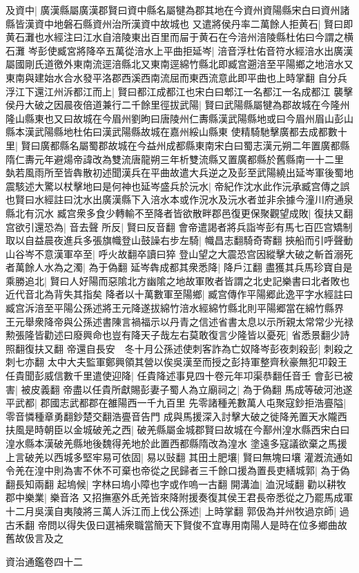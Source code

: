 及資中|{
	廣漢縣屬廣漢郡賢曰資中縣名屬犍為郡其地在今資州資陽縣宋白曰資州諸縣皆漢資中地磐石縣資州治所漢資中故城也}
又遣將侯丹率二萬餘人拒黄石|{
	賢曰即黄石灘也水經注曰江水自涪陵東出百里而屇于黄石在今涪州涪陵縣杜佑曰今謂之横石灘}
岑彭使臧宮將降卒五萬從涪水上平曲拒延岑|{
	涪音浮杜佑音符水經涪水出廣漢屬國剛氏道徼外東南流逕涪縣北又東南逕綿竹縣北即臧宫遡涪至平陽鄉之地涪水又東南與建始水合水發平洛郡西溪西南流屈而東西流意此即平曲也上時掌翻}
自分兵浮江下還江州泝都江而上|{
	賢曰都江成都江也宋白曰郫江一名都江一名成都江}
襲擊侯丹大破之因晨夜倍道兼行二千餘里徑拔武陽|{
	賢曰武陽縣屬犍為郡故城在今隆州隆山縣東也又曰故城在今眉州劉昫曰唐陵州仁夀縣漢武陽縣地或曰今眉州眉山彭山縣本漢武陽縣地杜佑曰漢武陽縣故城在嘉州綏山縣東}
使精騎馳擊廣都去成都數十里|{
	賢曰廣都縣名屬蜀郡故城在今益州成都縣東南宋白曰蜀志漢元朔二年置廣都縣隋仁夀元年避煬帝諱改為雙流唐龍朔三年析雙流縣又置廣都縣於舊縣南一十二里}
埶若風雨所至皆犇散初述聞漢兵在平曲故遣大兵逆之及彭至武陽繞出延岑軍後蜀地震駭述大驚以杖擊地曰是何神也延岑盛兵於沅水|{
	帝紀作沈水此作沅承臧宫傳之誤也賢曰水經註曰沈水出廣漢縣下入涪水本或作況水及沅水者並非余據今潼川府通泉縣北有沉水}
臧宫衆多食少轉輸不至降者皆欲散畔郡邑復更保聚觀望成敗|{
	復扶又翻}
宫欲引還恐為|{
	音去聲}
所反|{
	賢曰反音翻}
會帝遣謁者將兵詣岑彭有馬七百匹宫矯制取以自益晨夜進兵多張旗幟登山鼓譟右步左騎|{
	幟昌志翻騎奇寄翻}
挾船而引呼聲動山谷岑不意漢軍卒至|{
	呼火故翻卒讀曰猝}
登山望之大震恐宫因縱擊大破之斬首溺死者萬餘人水為之濁|{
	為于偽翻}
延岑犇成都其衆悉降|{
	降戶江翻}
盡獲其兵馬珍寶自是乘勝追北|{
	賢曰人好陽而惡隂北方幽隂之地故軍敗者皆謂之北史記樂書曰北者敗也近代音北為背失其指矣}
降者以十萬數軍至陽鄉|{
	臧宫傳作平陽郷此逸平字水經註曰臧宫泝涪至平陽公孫述將王元降遂拔綿竹涪水經綿竹縣北則平陽郷當在綿竹縣界}
王元舉衆降帝與公孫述書陳言禍福示以丹青之信述省書太息以示所親太常常少光禄勲張隆皆勸述曰廢興命也豈有降天子哉左右莫敢復言少隆皆以憂死|{
	省悉景翻少詩照翻復扶又翻}
帝還自長安　冬十月公孫述使刺客詐為亡奴降岑彭夜刺殺彭|{
	刺殺之刺七亦翻}
太中大夫監軍鄭興領其營以俟吳漢至而授之彭持軍整齊秋豪無犯卭穀王任貴聞彭威信數千里遣使迎降|{
	任貴降述事見四十卷元年卭渠恭翻任音壬}
會彭已被害|{
	被皮義翻}
帝盡以任貴所獻賜彭妻子蜀人為立廟祠之|{
	為于偽翻}
馬成等破河池遂平武都|{
	郡國志武都郡在雒陽西一千九百里}
先零諸種羌數萬人屯聚寇鈔拒浩亹隘|{
	零音憐種章勇翻鈔楚交翻浩亹音告門}
成與馬援深入討擊大破之徙降羌置天水隴西扶風是時朝臣以金城破羌之西|{
	破羌縣屬金城郡賢曰故城在今鄯州湟水縣西宋白曰湟水縣本漢破羌縣地後魏得羌地於此置西都縣隋改為湟水}
塗遠多寇議欲棄之馬援上言破羌以西城多堅牢易可依固|{
	易以䜴翻}
其田土肥壤|{
	賢曰無塊曰壤}
灌漑流通如令羌在湟中則為害不休不可棄也帝從之民歸者三千餘口援為置長吏繕城郭|{
	為于偽翻長知兩翻}
起塢候|{
	字林曰塢小障也字或作嗚一古翻}
開溝洫|{
	洫況域翻}
勸以耕牧郡中樂業|{
	樂音洛}
又招撫塞外氐羌皆來降附援奏復其侯王君長帝悉從之乃罷馬成軍　十二月吳漢自夷陵將三萬人泝江而上伐公孫述|{
	上時掌翻}
郭伋為并州牧過京師|{
	過古禾翻}
帝問以得失伋曰選補衆職當簡天下賢俊不宜專用南陽人是時在位多鄉曲故舊故伋言及之

資治通鑑卷四十二
